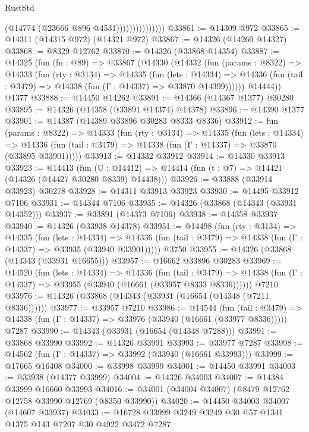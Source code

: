 \begin{lexlean}{RustStd}
\begin{coremodule}
                              (@14774 (@23666 @896 @4531)))))))))))))))
@33861 := @14309 @972
@33865 := @14311 (@14315 @972) (@14321 @972)
@33867 := @14326 (@14260 @14327)
@33868 := @8329 @12762
@33870 := @14326 (@33868 @14354)
@33887 := @14325
    (fun (fn : @89) =>
    @33867
      (@14330
        (@14332
          (fun (params : @8322) =>
          @14333
            (fun (rty : @3134) =>
            @14335
              (fun (lets : @14334) =>
              @14336 (fun (tail : @3479) => @14338 (fun (Γ : @14337) => @33870 @14399))))))
        @14444))
    @1377
@33888 := @14450 @14262
@33891 := @14366 (@14367 @1377) @30280
@33895 := @14326 (@14358 (@33891 @14374) @14378)
@33896 := @14390 @1377
@33901 := @14387 (@14389 @33896 @30283 @8333 @8336)
@33912 := fun (params : @8322) =>
  @14333
    (fun (rty : @3134) =>
    @14335
      (fun (lets : @14334) =>
      @14336 (fun (tail : @3479) => @14338 (fun (Γ : @14337) => @33870 (@33895 @33901)))))
@33913 := @14332 @33912
@33914 := @14330 @33913
@33923 := @14413
    (fun (U : @14412) => @14414 (fun (t : @7) => @14421 (@14326 (@14427 @30280 @8339) @14438)))
@33926 := @33888 (@33914 @33923) @30278
@33928 := @14311 @33913 @33923
@33930 := @14495 @33912 @7106
@33931 := @14344 @7106
@33935 := @14326 (@33868 (@14343 (@33931 @14352)))
@33937 := @33891 (@14373 @7106)
@33938 := @14358 @33937
@33940 := @14326 (@33938 @14378)
@33951 := @14498
    (fun (rty : @3134) =>
    @14335
      (fun (lets : @14334) =>
      @14336 (fun (tail : @3479) => @14338 (fun (Γ : @14337) => @33935 (@33940 @33901)))))
    @3750
@33955 := @14326 (@33868 (@14343 (@33931 @16655)))
@33957 := @16662 @33896 @30283
@33969 := @14520
    (fun (lets : @14334) =>
    @14336
      (fun (tail : @3479) =>
      @14338 (fun (Γ : @14337) => @33955 (@33940 (@16661 (@33957 @8333 @8336))))))
    @7210
@33976 := @14326 (@33868 (@14343 (@33931 (@16654 (@14348 (@7211 @8336))))))
@33977 := @33957 @7210
@33986 := @14544
    (fun (tail : @3479) => @14338 (fun (Γ : @14337) => @33976 (@33940 (@16661 (@33977 @8336)))))
    @7287
@33990 := @14343 (@33931 (@16654 (@14348 @7288)))
@33991 := @33868 @33990
@33992 := @14326 @33991
@33993 := @33977 @7287
@33998 := @14562 (fun (Γ : @14337) => @33992 (@33940 (@16661 @33993)))
@33999 := @17665 @16408
@34000 := @33998 @33999
@34001 := @14450 @33991
@34003 := @33938 (@14377 @33999)
@34004 := @14326 @34003
@34007 := @14384 @33999 @16660 @33993
@34016 := @34001 (@34004 @34007) (@8479 @12762 @12758 @33990 @12769 (@8350 @33990))
@34020 := @14450 @34003 @34007 (@14607 @33937)
@34033 := @16728 @33999 @3249 @3249 @30 @57 @1341 @1375 @143 @7207 @30 @4922 @3472 @7287

\end{coremodule}
\end{lexlean}
